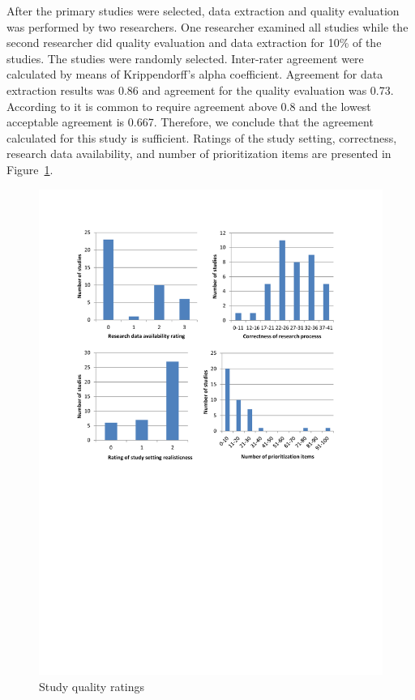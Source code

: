 After the primary studies were selected, data extraction and quality evaluation was performed by two researchers.
One researcher examined all studies while the second researcher did quality evaluation and data extraction for 10\% of the studies. 
The studies were randomly selected.
Inter-rater agreement were calculated by means of Krippendorff's alpha coefficient.
Agreement for data extraction results was 0.86 and agreement for the quality evaluation was 0.73.
According to \citet{Krippendorff2004a} it is common to require agreement above 0.8 and the lowest acceptable agreement is 0.667. Therefore, we conclude that the agreement calculated for this study is sufficient.
Ratings of the study setting, correctness, research data availability, and number of prioritization items are presented in Figure~\ref{fig:qeResults}.

\begin{figure}
	\center
\includegraphics[bb=60bp 360bp 560bp 790bp,clip,scale=0.75]{fig/qeResults}
\caption{\label{fig:qeResults}Study quality ratings}
\end{figure}

